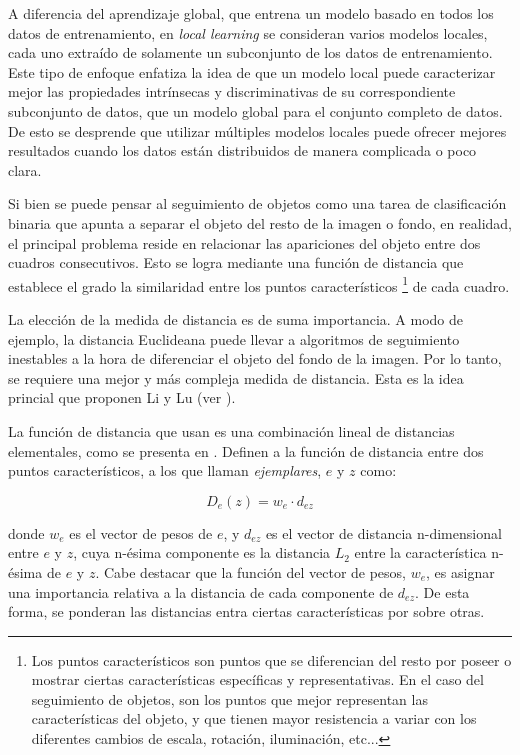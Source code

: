 A diferencia del aprendizaje global, que entrena un modelo basado en
todos los datos de entrenamiento, en \textit{local learning} se consideran
varios modelos locales, cada uno extraído de solamente un subconjunto de los
datos de entrenamiento. Este tipo de enfoque enfatiza la idea de que un modelo
local puede caracterizar mejor las propiedades intrínsecas y discriminativas de
su correspondiente subconjunto de datos, que un modelo global para el conjunto
completo de datos. De esto se desprende que utilizar múltiples modelos locales
puede ofrecer mejores resultados cuando los datos están distribuidos de manera
complicada o poco clara.

Si bien se puede pensar al seguimiento de objetos como una tarea de clasificación binaria
que apunta a separar el objeto del resto de la imagen o fondo, en realidad, el principal
problema reside en relacionar las apariciones del objeto entre dos cuadros
consecutivos. Esto se logra mediante una función de distancia que
establece el grado la similaridad entre los puntos característicos \footnote{Los puntos
  característicos son puntos que se diferencian del resto por poseer o mostrar
ciertas características específicas y representativas. En el caso del
seguimiento de objetos, son los puntos que mejor representan las
características del objeto, y que tienen mayor resistencia a variar con los
diferentes cambios de escala, rotación, iluminación, etc...} de cada cuadro.

La elección de la medida de distancia es de suma importancia. A modo de
ejemplo, la distancia Euclideana puede llevar a algoritmos de seguimiento
inestables a la hora de diferenciar el objeto del fondo de la imagen. Por lo
tanto, se requiere una mejor y más compleja medida de distancia. Esta es la
idea princial que proponen Li y Lu (ver \cite{local-learning}).

La función de distancia que usan es una combinación lineal de distancias
elementales, como se presenta en \cite{malisiewicz-cvpr08}. Definen a la
función de distancia entre dos puntos característicos, a los que llaman
\textit{ejemplares}, $e$ y $z$ como:

\begin{equation}
    \label{eq:distance-exemplar}
    D_{e}(z) = w_{e} \cdot d_{ez}
\end{equation}

donde $w_{e}$ es el vector de pesos de $e$, y $d_{ez}$ es el vector de
distancia n-dimensional entre $e$ y $z$, cuya n-ésima componente es la
distancia $L_{2}$ entre la característica n-ésima de $e$ y $z$. Cabe destacar
que la función del vector de pesos, $w_{e}$, es asignar una importancia relativa a
la distancia de cada componente de $d_{ez}$. De esta forma, se ponderan las distancias
entra ciertas características por sobre otras.

